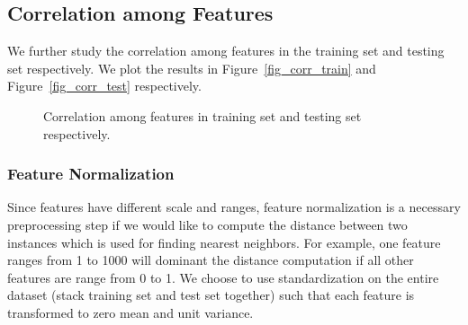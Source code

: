 \documentclass[10pt, oneside]{article}   	%
\begin{document}


\subsection{Correlation among Features} We further study the correlation among features in the training set and testing set respectively. We plot the results in Figure~\ref{fig_corr_train} and Figure~\ref{fig_corr_test} respectively. 

\begin{figure}[!ht] %
   \centering
   \caption{Correlation among features in training set and testing set respectively.}  
\end{figure}



\subsubsection{Feature Normalization}
Since features have different scale and ranges, feature normalization is a necessary preprocessing step if we would like to compute the distance between two instances which is used for finding nearest neighbors. 
For example, one feature ranges from 1 to 1000 will dominant the distance computation if all other features are range from 0 to 1.
We choose to use standardization on the entire dataset (stack training set and test set together) such that each feature is transformed to zero mean and unit variance.
\end{document}

